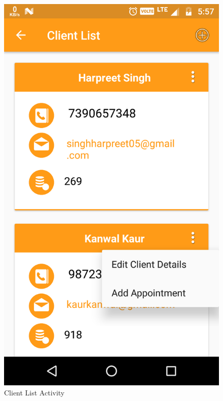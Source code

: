 \\
\begin{figure}[h]
	\centering
	\includegraphics[width=0.7\linewidth]{ClientList}
	\caption{Client List Activity}
\end{figure}
\pagebreak

